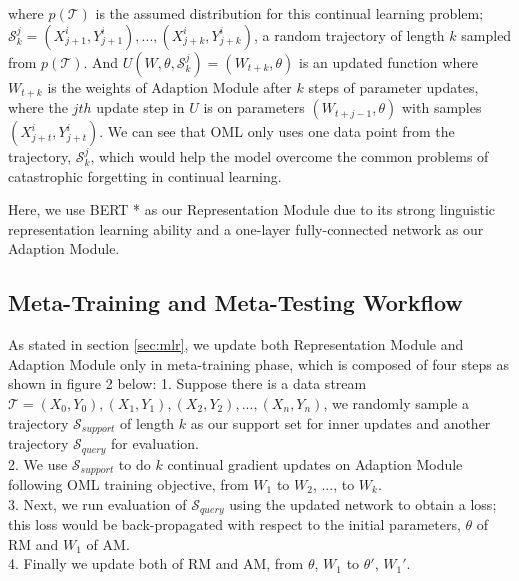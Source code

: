 where $p(\mathcal{T})$ is the assumed distribution for this continual learning problem; $\mathcal{S}_k ^ j = (X_{j+1}^i, Y_{j+1}^i), ..., (X_{j+k}^i, Y_{j+k}^i)$, a random trajectory of length $k$ sampled from $p(\mathcal{T})$. And $U(W, \theta, \mathcal{S}_k ^ j) = (W_{t+k}, \theta)$ is an updated function where $W_{t+k}$ is the weights of Adaption Module after $k$ steps of parameter updates, where the $jth$ update step in $U$ is on parameters $(W_{t+j-1}, \theta)$ with samples $(X_{j+t}^i, Y_{j+t}^i)$. We can see that OML only uses one data point from the trajectory, $\mathcal{S}_k ^ j$, which would help the model overcome the common problems of catastrophic forgetting in continual learning. 

Here, we use BERT * as our Representation Module due to its strong linguistic representation learning ability and a one-layer fully-connected network as our Adaption Module. 

\subsection{Meta-Training and Meta-Testing Workflow}
As stated in section \ref{sec:mlr}, we update both Representation Module and Adaption Module only in meta-training phase, which is composed of four steps as shown in figure 2 below: 
1. Suppose there is a data stream $\mathcal{T} = (X_0, Y_0), (X_1, Y_1), (X_2, Y_2), ..., (X_n, Y_n)$, we randomly sample a trajectory $\mathcal{S}_{support}$ of length $k$ as our support set for inner updates and another trajectory $\mathcal{S}_{query}$ for evaluation. \\
2. We use $\mathcal{S}_{support}$ to do $k$ continual gradient updates on Adaption Module following OML training objective, from  $W_1$ to $W_2$, ..., to $W_k$. \\
3. Next, we run evaluation of $\mathcal{S}_{query}$ using the updated network to obtain a loss; this loss would be back-propagated with respect to the initial parameters, $\theta$ of RM and $W_1$ of AM. \\
4. Finally we update both of RM and AM, from  $\theta$, $W_1$ to $\theta'$, $W_1'$.

